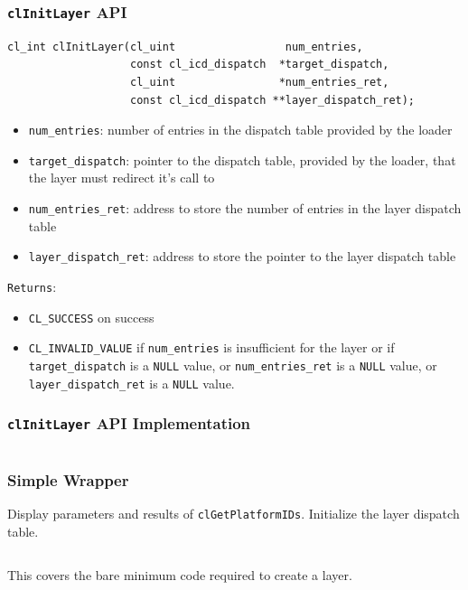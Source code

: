 \documentclass[
    ignorenonframetext,
  ]{beamer}
\begin{document}
\begin{frame}[fragile]
  \frametitle{\texttt{clInitLayer} API}
\tiny
  \begin{verbatim}
cl_int clInitLayer(cl_uint                 num_entries,
                   const cl_icd_dispatch  *target_dispatch,
                   cl_uint                *num_entries_ret,
                   const cl_icd_dispatch **layer_dispatch_ret);
\end{verbatim}
\begin{itemize}
\scriptsize
\item \texttt{num\_entries}: number of entries in the dispatch table provided by the loader
\item \texttt{target\_dispatch}: pointer to the dispatch table, provided by the loader, that the layer must redirect it’s call to
\item \texttt{num\_entries\_ret}: address to store the number of entries in the layer dispatch table
\item \texttt{layer\_dispatch\_ret}: address to store the pointer to the layer dispatch table
\end{itemize}
\scriptsize
\texttt{Returns}:
\begin{itemize}
\scriptsize
\item \texttt{CL\_SUCCESS} on success
\item \texttt{CL\_INVALID\_VALUE} if \texttt{num\_entries} is insufficient for the layer or if \texttt{target\_dispatch} is a \texttt{NULL} value, or \texttt{num\_entries\_ret} is a \texttt{NULL} value, or \texttt{layer\_dispatch\_ret} is a \texttt{NULL} value.
\end{itemize}
\end{frame}

\begin{frame}[fragile]
\frametitle{\texttt{clInitLayer} API Implementation}
\tiny
\inputminted[linenos,firstline=31,lastline=51]{c}{../example_layer/example_layer.c}
\end{frame}

\begin{frame}[fragile]
\frametitle{Simple Wrapper}
Display parameters and results of \texttt{clGetPlatformIDs}. Initialize the layer dispatch table.
\tiny
\inputminted[linenos,firstline=53]{c}{../example_layer/example_layer.c}
\normalsize
This covers the bare minimum code required to create a layer.
\end{frame}
\end{document}
